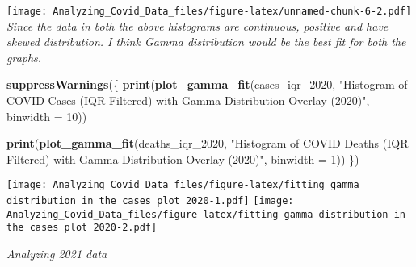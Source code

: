 \documentclass[
]{article}
\newenvironment{Shaded}{\begin{snugshade}}{\end{snugshade}}
\newcommand{\AttributeTok}[1]{\textcolor[rgb]{0.13,0.29,0.53}{#1}}
\newcommand{\CommentTok}[1]{\textcolor[rgb]{0.56,0.35,0.01}{\textit{#1}}}
\newcommand{\DecValTok}[1]{\textcolor[rgb]{0.00,0.00,0.81}{#1}}
\newcommand{\FunctionTok}[1]{\textcolor[rgb]{0.13,0.29,0.53}{\textbf{#1}}}
\newcommand{\NormalTok}[1]{#1}
\newcommand{\OtherTok}[1]{\textcolor[rgb]{0.56,0.35,0.01}{#1}}
\newcommand{\SpecialCharTok}[1]{\textcolor[rgb]{0.81,0.36,0.00}{\textbf{#1}}}
\newcommand{\StringTok}[1]{\textcolor[rgb]{0.31,0.60,0.02}{#1}}
\begin{document}
\texttt{[image: Analyzing\_Covid\_Data\_files/figure-latex/unnamed-chunk-6-2.pdf]}
\emph{Since the data in both the above histograms are continuous,
positive and have skewed distribution. I think Gamma distribution would
be the best fit for both the graphs.}

\begin{Shaded}
\begin{Highlighting}[]
\FunctionTok{suppressWarnings}\NormalTok{(\{}
\FunctionTok{print}\NormalTok{(}\FunctionTok{plot\_gamma\_fit}\NormalTok{(cases\_iqr\_2020, }\StringTok{"Histogram of COVID Cases (IQR Filtered) with Gamma Distribution Overlay (2020)"}\NormalTok{, }\AttributeTok{binwidth =} \DecValTok{10}\NormalTok{))}

\FunctionTok{print}\NormalTok{(}\FunctionTok{plot\_gamma\_fit}\NormalTok{(deaths\_iqr\_2020, }\StringTok{"Histogram of COVID Deaths (IQR Filtered) with Gamma Distribution Overlay (2020)"}\NormalTok{, }\AttributeTok{binwidth =} \DecValTok{1}\NormalTok{))}
\NormalTok{\})}
\end{Highlighting}
\end{Shaded}

\texttt{[image: Analyzing\_Covid\_Data\_files/figure-latex/fitting gamma distribution in the cases plot 2020-1.pdf]}
\texttt{[image: Analyzing\_Covid\_Data\_files/figure-latex/fitting gamma distribution in the cases plot 2020-2.pdf]}

\emph{Analyzing 2021 data}

\begin{Shaded}
\end{Shaded}
\end{document}
